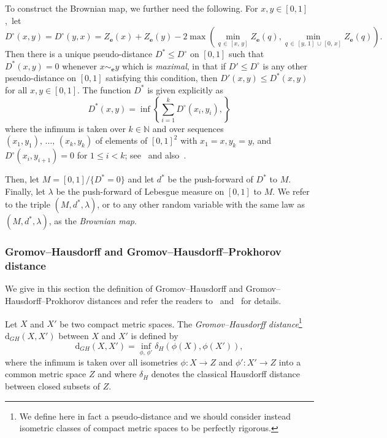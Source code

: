 \documentclass[10pt]{amsart}
\theoremstyle{definition}\newtheorem{defi}[theo]{Definition}\newtheorem{rema}[theo]{Remark}\newtheorem{exam}[theo]{Example}\newtheorem{exem}[theo]{Example}\newtheorem{nota}[theo]{Notation}
\providecommand{\N}{}
\renewcommand{\N}{\mathbb{N}}
\newcommand{\be}{\mathbf{e}}
\newcommand{\rd}{\mathrm{d}}
\begin{document}
To construct the Brownian map, we further need the following. For $x,y\in [0,1]$,~let
\begin{equation}\label{eq:defDrond}
D^\circ(x,y)=D^\circ(y,x)=Z_{\be}(x)+Z_{\be}(y)-2\max\left(\min_{q\,\in\,[x,\,y]} Z_{\be}(q),\min_{q\,\in\,[y,\,1]\,\cup\,[0,\,x]}Z_{\be}(q)\right).
\end{equation}
Then there is a unique pseudo-distance $D^* \le D^\circ$ on $[0,1]$ such that $D^*(x,y)=0$ whenever $x\sim_{\be}y$ which is {\em maximal}, in that if $D' \le D^\circ$ is any other pseudo-distance on $[0,1]$ satisfying this condition, then $D'(x,y) \le D^*(x,y)$ for all $x,y \in [0,1]$. The function $D^*$ is given explicitly as
\[
D^*(x,y) = \inf\left\{\sum_{i=1}^k D^\circ(x_i,y_i),\right\}
\]
where the infimum is taken over $k \in \N$ and over sequences $(x_1,y_1),\,\ldots,\,(x_k,y_k)$ of elements of $[0,1]^2$ with $x_1=x,y_k=y$, and $D^{\circ}(x_{i},y_{i+1})=0$ for $1 \le i < k$; see~\cite[Section~3.1.2]{MR1835418} and also~\cite{LeGallInventiones,MiermontBrownian}.

Then, let $M=[0,1]/\{D^*=0\}$ and let $d^*$ be the push-forward of $D^*$ to $M$. Finally, let $\lambda$ be the push-forward of Lebesgue measure on $[0,1]$ to $M$. We refer to the triple $(M,d^*,\lambda)$, or to any other random variable with the same law as $(M,d^*,\lambda)$, as the \emph{Brownian map}.

\subsubsection{Gromov--Hausdorff and Gromov--Hausdorff--Prokhorov distance}

We give in this section the definition of Gromov--Hausdorff and Gromov--Hausdorff--Prokhorov distances and refer the readers to~\cite{GrevenPfaffelhuberWinter} and~\cite[Section~6]{Mier09} for details.

Let $X$ and $X'$ be two compact metric spaces. The \emph{Gromov--Hausdorff distance}\footnote{We define here in fact a pseudo-distance and we should consider instead isometric classes of compact metric spaces to be perfectly rigorous.} $\rd_{GH}(X,X')$ between $X$ and $X'$ is defined by
\[
\rd_{GH}(X,X')=\inf_{\phi,\,\phi'}\delta_H\left(\phi(X),\phi(X')\right),
\]
where the infimum is taken over all isometries $\phi:X\rightarrow Z$ and $\phi':X'\rightarrow Z$ into a common metric space $Z$ and where $\delta_H$ denotes the classical Hausdorff distance between closed subsets of $Z$.
\end{document}
